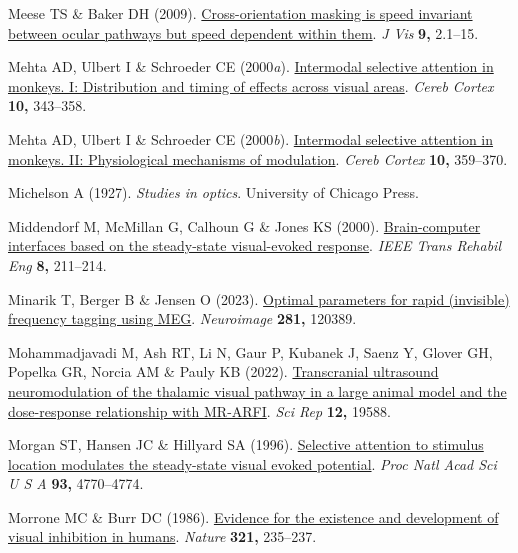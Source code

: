 \documentclass[
  letterpaper,
  DIV=11,
  numbers=noendperiod]{scrartcl}
\newlength{\cslhangindent}
\newenvironment{CSLReferences}[2] %
 {\begin{list}{}{%
  \setlength{\itemindent}{0pt}
  \setlength{\leftmargin}{0pt}
  \setlength{\parsep}{0pt}
  \ifodd #1
   \setlength{\leftmargin}{\cslhangindent}
   \setlength{\itemindent}{-1\cslhangindent}
  \fi
  \setlength{\itemsep}{#2\baselineskip}}}
 {\end{list}}
\begin{document}
\begin{CSLReferences}{1}{1}
Meese TS \& Baker DH (2009).
\href{https://doi.org/10.1167/9.5.2}{Cross-orientation masking is speed
invariant between ocular pathways but speed dependent within them}.
\emph{J Vis} \textbf{9,} 2.1--15.

Mehta AD, Ulbert I \& Schroeder CE (2000\emph{a}).
\href{https://doi.org/10.1093/cercor/10.4.343}{Intermodal selective
attention in monkeys. I: Distribution and timing of effects across
visual areas}. \emph{Cereb Cortex} \textbf{10,} 343--358.

Mehta AD, Ulbert I \& Schroeder CE (2000\emph{b}).
\href{https://doi.org/10.1093/cercor/10.4.359}{Intermodal selective
attention in monkeys. II: Physiological mechanisms of modulation}.
\emph{Cereb Cortex} \textbf{10,} 359--370.

Michelson A (1927). \emph{Studies in optics}. University of Chicago
Press.

Middendorf M, McMillan G, Calhoun G \& Jones KS (2000).
\href{https://doi.org/10.1109/86.847819}{Brain-computer interfaces based
on the steady-state visual-evoked response}. \emph{IEEE Trans Rehabil
Eng} \textbf{8,} 211--214.

Minarik T, Berger B \& Jensen O (2023).
\href{https://doi.org/10.1016/j.neuroimage.2023.120389}{Optimal
parameters for rapid (invisible) frequency tagging using MEG}.
\emph{Neuroimage} \textbf{281,} 120389.

Mohammadjavadi M, Ash RT, Li N, Gaur P, Kubanek J, Saenz Y, Glover GH,
Popelka GR, Norcia AM \& Pauly KB (2022).
\href{https://doi.org/10.1038/s41598-022-20554-4}{Transcranial
ultrasound neuromodulation of the thalamic visual pathway in a large
animal model and the dose-response relationship with MR-ARFI}. \emph{Sci
Rep} \textbf{12,} 19588.

Morgan ST, Hansen JC \& Hillyard SA (1996).
\href{https://doi.org/10.1073/pnas.93.10.4770}{Selective attention to
stimulus location modulates the steady-state visual evoked potential}.
\emph{Proc Natl Acad Sci U S A} \textbf{93,} 4770--4774.

Morrone MC \& Burr DC (1986).
\href{https://doi.org/10.1038/321235a0}{Evidence for the existence and
development of visual inhibition in humans}. \emph{Nature} \textbf{321,}
235--237.


\end{CSLReferences}
\end{document}
